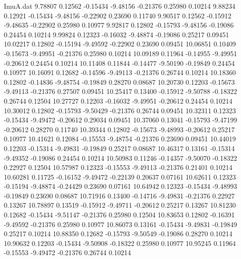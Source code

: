 \begin{filecontents}{ImuA.dat}
   9.78807    0.12562   -0.15434   -9.48156   -0.21376    0.25980    0.10214
   9.88234    0.12921   -0.15434   -9.48156   -0.22902    0.23690    0.11740
   9.90517    0.12562   -0.15912   -9.48635   -0.22902    0.25980    0.10977
   9.92817    0.12802   -0.15793   -9.48156   -0.19086    0.24454    0.10214
   9.99824    0.12323   -0.16032   -9.48874   -0.19086    0.25217    0.09451
  10.02217    0.12802   -0.15194   -9.49592   -0.22902    0.23690    0.09451
  10.06851    0.10409   -0.15673   -9.49951   -0.21376    0.25980    0.10214
  10.09189    0.11964   -0.14955   -9.49951   -0.20612    0.24454    0.10214
  10.11408    0.11844   -0.14477   -9.50190   -0.19849    0.24454    0.10977
  10.16091    0.12682   -0.14596   -9.49113   -0.21376    0.26744    0.10214
  10.18360    0.12802   -0.14836   -9.48754   -0.19849    0.28270    0.08687
  10.20730    0.12203   -0.15673   -9.49113   -0.21376    0.27507    0.09451
  10.25417    0.13400   -0.15912   -9.50788   -0.18322    0.26744    0.12504
  10.27727    0.12203   -0.16032   -9.49951   -0.20612    0.24454    0.10214
  10.30012    0.12802   -0.15793   -9.50429   -0.21376    0.26744    0.09451
  10.32311    0.12323   -0.15434   -9.49472   -0.20612    0.29034    0.09451
  10.37060    0.13041   -0.15793   -9.47199   -0.20612    0.28270    0.11740
  10.39344    0.12802   -0.15673   -9.48993   -0.20612    0.25217    0.10977
  10.41621    0.12084   -0.15553   -9.48754   -0.21376    0.23690    0.09451
  10.44019    0.12203   -0.15314   -9.49831   -0.19849    0.25217    0.08687
  10.46317    0.13161   -0.15314   -9.49352   -0.19086    0.24454    0.10214
  10.50983    0.11246   -0.14357   -9.50070   -0.18322    0.22927    0.12504
  10.57987    0.12323   -0.15553   -9.49113   -0.21376    0.21401    0.10214
  10.60281    0.11725   -0.16152   -9.49472   -0.22139    0.20637    0.07161
  10.62611    0.12323   -0.15194   -9.48874   -0.24429    0.23690    0.07161
  10.64942    0.12323   -0.15434   -9.48993   -0.19849    0.23690    0.08687
  10.71916    0.13400   -0.14716   -9.49831   -0.21376    0.22927    0.13267
  10.78897    0.13519   -0.15912   -9.49711   -0.20612    0.25217    0.13267
  10.81230    0.12682   -0.15434   -9.51147   -0.21376    0.25980    0.12504
  10.83653    0.12802   -0.16391   -9.49592   -0.21376    0.25980    0.10977
  10.86073    0.13161   -0.15434   -9.49831   -0.19849    0.25217    0.10214
  10.88350    0.12682   -0.15793   -9.50549   -0.19086    0.28270    0.10214
  10.90632    0.12203   -0.15434   -9.50908   -0.18322    0.25980    0.10977
  10.95245    0.11964   -0.15553   -9.49472   -0.21376    0.26744    0.10214

\end{filecontents}

